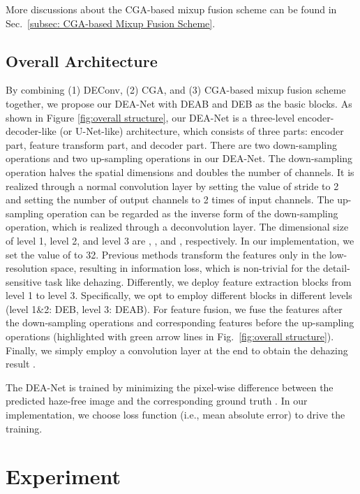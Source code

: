 \documentclass[lettersize,journal]{IEEEtran}
\begin{document}
More discussions about the CGA-based mixup fusion scheme can be found in Sec.~\ref{subsec: CGA-based Mixup Fusion Scheme}.

\subsection{Overall Architecture}
By combining (1) DEConv, (2) CGA, and (3) CGA-based mixup fusion scheme together, we propose our DEA-Net with DEAB and DEB as the basic blocks.
As shown in Figure \ref{fig:overall structure}, our DEA-Net is a three-level encoder-decoder-like (or U-Net-like) architecture, which consists of three parts: encoder part, feature transform part, and decoder part.
There are two down-sampling operations and two up-sampling operations in our DEA-Net.
The down-sampling operation halves the spatial dimensions and doubles the number of channels. 
It is realized through a normal convolution layer by setting the value of stride to 2 and setting the number of output channels to 2 times of input channels.
The up-sampling operation can be regarded as the inverse form of the down-sampling operation, which is realized through a deconvolution layer.
The dimensional size of level 1, level 2, and level 3 are , , and , respectively.
In our implementation, we set the value of  to 32.
Previous methods \cite{wu2021CVPR,hong2022AAAI} transform the features only in the low-resolution space, resulting in information loss, which is non-trivial for the detail-sensitive task like dehazing. 
Differently, we deploy feature extraction blocks from level 1 to level 3.
Specifically, we opt to employ different blocks in different levels (level 1\&2: DEB, level 3: DEAB).
For feature fusion, we fuse the features after the down-sampling operations and corresponding features before the up-sampling operations (highlighted with green arrow lines in Fig.~\ref{fig:overall structure}).
Finally, we simply employ a  convolution layer at the end to obtain the dehazing result .




The DEA-Net is trained by minimizing the pixel-wise difference between the predicted haze-free image  and the corresponding ground truth .
In our implementation, we choose  loss function (i.e., mean absolute error) to drive the training.










\section{Experiment}
\label{sec: experiment}
\end{document}
